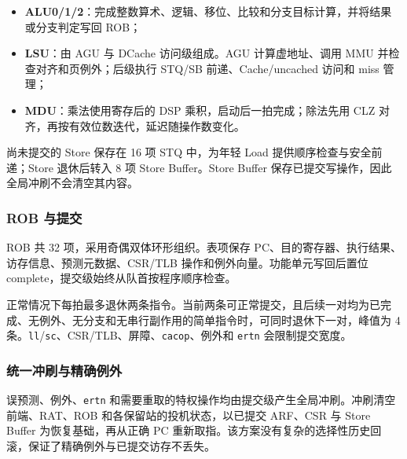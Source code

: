 \begin{itemize}
  \item \textbf{ALU0/1/2}：完成整数算术、逻辑、移位、比较和分支目标计算，并将结果或分支判定写回 ROB；
  \item \textbf{LSU}：由 AGU 与 DCache 访问级组成。AGU 计算虚地址、调用 MMU 并检查对齐和页例外；后级执行 STQ/SB 前递、Cache/uncached 访问和 miss 管理；
  \item \textbf{MDU}：乘法使用寄存后的 DSP 乘积，启动后一拍完成；除法先用 CLZ 对齐，再按有效位数迭代，延迟随操作数变化。
\end{itemize}

尚未提交的 Store 保存在 16 项 STQ 中，为年轻 Load 提供顺序检查与安全前递；Store 退休后转入 8 项 Store Buffer。Store Buffer 保存已提交写操作，因此全局冲刷不会清空其内容。

\subsubsection{ROB 与提交}

ROB 共 32 项，采用奇偶双体环形组织。表项保存 PC、目的寄存器、执行结果、访存信息、预测元数据、CSR/TLB 操作和例外向量。功能单元写回后置位 complete，提交级始终从队首按程序顺序检查。

正常情况下每拍最多退休两条指令。当前两条可正常提交，且后续一对均为已完成、无例外、无分支和无串行副作用的简单指令时，可同时退休下一对，峰值为 4 条。\texttt{ll}/\texttt{sc}、CSR/TLB、屏障、\texttt{cacop}、例外和 \texttt{ertn} 会限制提交宽度。

\subsubsection{统一冲刷与精确例外}

误预测、例外、\texttt{ertn} 和需要重取的特权操作均由提交级产生全局冲刷。冲刷清空前端、RAT、ROB 和各保留站的投机状态，以已提交 ARF、CSR 与 Store Buffer 为恢复基础，再从正确 PC 重新取指。该方案没有复杂的选择性历史回滚，保证了精确例外与已提交访存不丢失。
